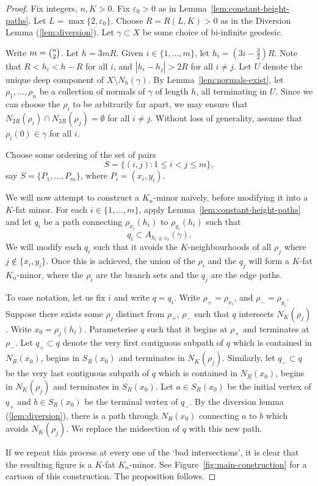 \documentclass[10pt,a4paper]{amsart}
\theoremstyle{definition}
\begin{document}
\begin{proof}
    Fix integers, $n, K > 0$.
    Fix $\varepsilon_0 > 0$ as in Lemma~\ref{lem:constant-height-paths}. Let $L = \max\{2, \varepsilon_0\}$. Choose $R = R(L , K)> 0$ as in the Diversion Lemma (\ref{lem:diversion}). Let $\gamma \subset X$ be some choice of bi-infinite geodesic. 

    Write $m = \tbinom n 2$. Let $h = 3mR$. Given $i \in \{1, \ldots, m\}$, let 
    $
    h_i = (3i - \tfrac3 2)R
    $. 
    Note that $R < h_i < h-R$ for all $i$, and $|h_i - h_j| > 2R$ for all $i \neq j$. 
    Let $U$ denote the unique deep component of $X \setminus N_h(\gamma)$. By Lemma~\ref{lem:normals-exist}, let $\rho_1, \ldots, \rho_n$ be a collection of normals of $\gamma$ of length $h$, all terminating in $U$. Since we can choose the $\rho_i$ to be arbitrarily far apart, we may ensure that 
    $
    N_{2R}(\rho_i) \cap N_{2R}(\rho_j) = \emptyset
    $ 
    for all $i \neq j$. Without loss of generality, assume that $\rho_i(0) \in \gamma$ for all $i$. 
    
    Choose some ordering of the set of pairs 
    $$
    S = \{(i, j ) : 1\leq i < j \leq m\},
    $$
    say $S = \{P_1, \ldots, P_m\}$, where $P_i = (x_i, y_i)$. 
    
    We will now attempt to construct a $K_n$-minor na\"ively, before modifying it into a $K$-fat minor. For each $i \in \{1, \ldots, m\}$, apply Lemma~\ref{lem:constant-height-paths} and let $q_i$ be a path connecting $\rho_{x_i}(h_i)$ to $\rho_{y_i}(h_i)$ such that 
    $$
    q_i \subset A_{h_i\pm\varepsilon_0}(\gamma). 
    $$
    We will modify each $q_i$ such that it avoids the $K$-neighbourhoods of all $\rho_j$ where $j \not\in\{x_i,y_i\}$. Once this is achieved, the union of the $\rho_i$ and the $q_j$ will form a $K$-fat $K_n$-minor, where the $\rho_i$ are the branch sets and the $q_j$ are the edge paths. 

    To ease notation, let us fix $i$ and write $q = q_i$. Write $\rho_+ = \rho_{x_i}$, and $\rho_- = \rho_{y_i}$.
    Suppose there exists some $\rho_j$ distinct from $\rho_+$, $\rho_-$ such that $q$ intersects $N_K(\rho_j)$. Write $x_0 = \rho_j(h_i)$. Parameterise $q$ such that it begins at $\rho_+$ and terminates at $\rho_-$. Let $q_+ \subset q$ denote the very first contiguous subpath of $q$ which is contained in $N_R(x_0)$, begins in $S_R(x_0)$ and terminates in $N_K(\rho_j)$. Similarly, let $q_- \subset q$ be the very last contiguous subpath of $q$ which is contained in $N_R(x_0)$, begins in $N_K(\rho_j)$ and terminates in $S_R(x_0)$. Let $a \in S_R(x_0)$ be the initial vertex of $q_+$ and $b \in S_R(x_0)$ be the terminal vertex of $q_-$. By the diversion lemma (\ref{lem:diversion}), there is a path through $N_R(x_0)$ connecting $a$ to $b$ which avoids $N_K(\rho_j)$. We replace the midsection of $q$ with this new path. 

    If we repeat this process at every one of the `bad intersections', it is clear that the resulting figure is a $K$-fat $K_n$-minor. See Figure~\ref{fig:main-construction} for a cartoon of this construction. The proposition follows. 
\end{proof}
\end{document}

